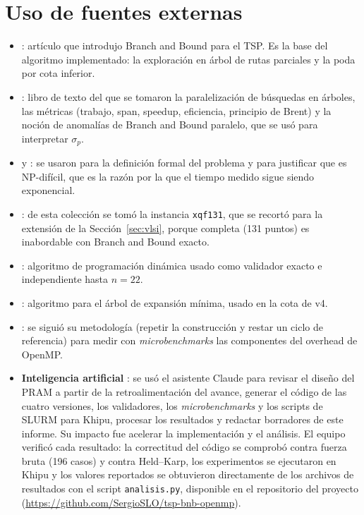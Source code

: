 \documentclass[12pt,a4paper]{article}
\begin{document}
\section{Uso de fuentes externas}
\label{sec:fuentes}

\begin{itemize}
    \item \textbf{\citet{little1963algorithm}}: artículo que introdujo Branch and Bound para el TSP. Es la base del algoritmo implementado: la exploración en árbol de rutas parciales y la poda por cota inferior.
    \item \textbf{\citet{grama2003introduction}}: libro de texto del que se tomaron la paralelización de búsquedas en árboles, las métricas (trabajo, span, speedup, eficiencia, principio de Brent) y la noción de anomalías de Branch and Bound paralelo, que se usó para interpretar $\sigma_p$.
    \item \textbf{\citet{applegate2006tsp}} y \textbf{\citet{garey1979computers}}: se usaron para la definición formal del problema y para justificar que es NP-difícil, que es la razón por la que el tiempo medido sigue siendo exponencial.
    \item \textbf{\citet{cook_vlsi}}: de esta colección se tomó la instancia \texttt{xqf131}, que se recortó para la extensión de la Sección~\ref{sec:vlsi}, porque completa (131 puntos) es inabordable con Branch and Bound exacto.
    \item \textbf{\citet{held1962dynamic}}: algoritmo de programación dinámica usado como validador exacto e independiente hasta $n=22$.
    \item \textbf{\citet{prim1957shortest}}: algoritmo para el árbol de expansión mínima, usado en la cota de v4.
    \item \textbf{\citet{bull1999measuring}}: se siguió su metodología (repetir la construcción y restar un ciclo de referencia) para medir con \textit{microbenchmarks} las componentes del overhead de OpenMP.
    \item \textbf{Inteligencia artificial} \citep{anthropic_claude}: se usó el asistente Claude para revisar el diseño del PRAM a partir de la retroalimentación del avance, generar el código de las cuatro versiones, los validadores, los \textit{microbenchmarks} y los scripts de SLURM para Khipu, procesar los resultados y redactar borradores de este informe. Su impacto fue acelerar la implementación y el análisis. El equipo verificó cada resultado: la correctitud del código se comprobó contra fuerza bruta (196 casos) y contra Held--Karp, los experimentos se ejecutaron en Khipu y los valores reportados se obtuvieron directamente de los archivos de resultados con el script \texttt{analisis.py}, disponible en el repositorio del proyecto (\url{https://github.com/SergioSLO/tsp-bnb-openmp}).
\end{itemize}



\end{document}
